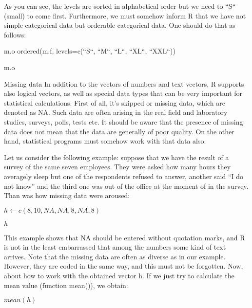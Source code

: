 \documentclass{beamer}
\begin{document}
\begin{frame}{}
As you can see, the levels are sorted in alphabetical order but we need to ``S`` (small) to come first. Furthermore, we must somehow inform R that we have not simple categorical data but orderable categorical data. One should do that as follows:
\begin{center}

m.o \leftarrow ordered(m.f, levels=c(``S``, ``M``, ``L``, ``XL``, ``XXL``))

m.o

\end{center}
\end{frame}

\begin{frame}{Missing data}
In addition to the vectors of numbers and text vectors, R supports also logical vectors, as well as special data types that can be very important for statistical calculations. First of all, it's skipped or missing data, which are denoted as NA. Such data are often arising in the real field and laboratory studies, surveys, polls, tests etc. It should be aware that the presence of missing data does not mean that the data are generally of poor quality. On the other hand, statistical programs must somehow work with that data also.
\end{frame}

\begin{frame}{}
Let us consider the following example: suppose that we have the result of a survey of the same seven employees. They were asked how many hours they averagely sleep but one of the respondents refused to answer, another said ``I do not know” and the third one was out of the office at the moment of in the survey. Than was how missing data were aroused:

\begin{center}
$h \leftarrow c(8, 10, NA, NA, 8, NA, 8)$

$h$
\end{center}
\end{frame}

\begin{frame}{}
This example shows that NA should be entered without quotation marks, and R is not in the least embarrassed that among the numbers some kind of text arrives. Note that the missing data are often as diverse as in our example. However, they are coded in the same way, and this must not be forgotten. Now, about how to work with the obtained vector h. If we just try to calculate the mean value (function mean()), we obtain:
\begin{center}
$mean(h)$
\end{center}
\end{frame}
\end{document}
